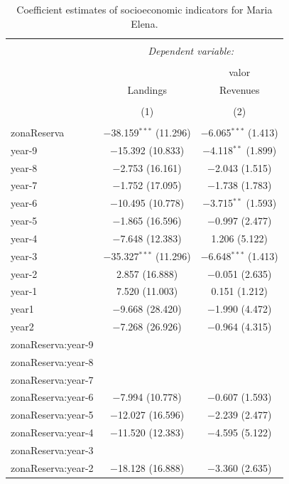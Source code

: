 \documentclass[]{article}
\begin{document}
\begin{table}[!htbp] \centering 
  \caption{Coefficient estimates of socioeconomic indicators for Maria Elena.} 
  \label{} 
\tiny 
\begin{tabular}{@{\extracolsep{1pt}}lcc} 
\\[-1.8ex]\hline 
\hline \\[-1.8ex] 
 & \multicolumn{2}{c}{\textit{Dependent variable:}} \\ 
\cline{2-3} 
\\[-1.8ex] &  & valor \\ 
 & Landings & Revenues \\ 
\\[-1.8ex] & (1) & (2)\\ 
\hline \\[-1.8ex] 
 zonaReserva & $-$38.159$^{***}$ (11.296) & $-$6.065$^{***}$ (1.413) \\ 
  year-9 & $-$15.392 (10.833) & $-$4.118$^{**}$ (1.899) \\ 
  year-8 & $-$2.753 (16.161) & $-$2.043 (1.515) \\ 
  year-7 & $-$1.752 (17.095) & $-$1.738 (1.783) \\ 
  year-6 & $-$10.495 (10.778) & $-$3.715$^{**}$ (1.593) \\ 
  year-5 & $-$1.865 (16.596) & $-$0.997 (2.477) \\ 
  year-4 & $-$7.648 (12.383) & 1.206 (5.122) \\ 
  year-3 & $-$35.327$^{***}$ (11.296) & $-$6.648$^{***}$ (1.413) \\ 
  year-2 & 2.857 (16.888) & $-$0.051 (2.635) \\ 
  year-1 & 7.520 (11.003) & 0.151 (1.212) \\ 
  year1 & $-$9.668 (28.420) & $-$1.990 (4.472) \\ 
  year2 & $-$7.268 (26.926) & $-$0.964 (4.315) \\ 
  zonaReserva:year-9 &  &  \\ 
  zonaReserva:year-8 &  &  \\ 
  zonaReserva:year-7 &  &  \\ 
  zonaReserva:year-6 & $-$7.994 (10.778) & $-$0.607 (1.593) \\ 
  zonaReserva:year-5 & $-$12.027 (16.596) & $-$2.239 (2.477) \\ 
  zonaReserva:year-4 & $-$11.520 (12.383) & $-$4.595 (5.122) \\ 
  zonaReserva:year-3 &  &  \\ 
  zonaReserva:year-2 & $-$18.128 (16.888) & $-$3.360 (2.635) \\ 

\end{tabular}
\end{table}
\end{document}
